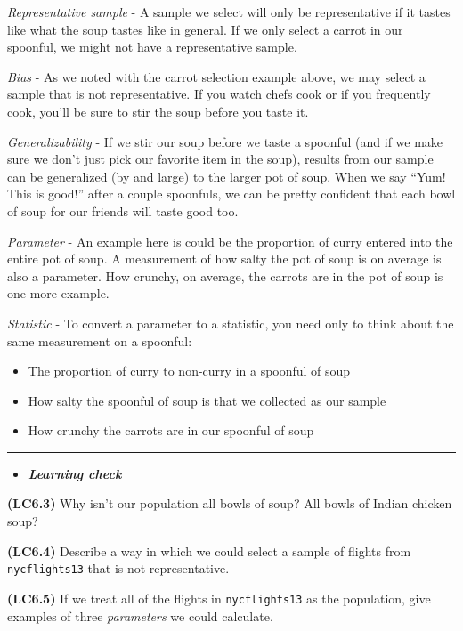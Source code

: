 \documentclass[]{tufte-book}
\let\oldrule=\rule
\renewcommand{\rule}[1]{\oldrule{\linewidth}}
\providecommand{\tightlist}{%
  \setlength{\itemsep}{0pt}\setlength{\parskip}{0pt}}
\newenvironment{rmdblock}[1]
  {\begin{shaded*}
  \begin{itemize}
  \renewcommand{\labelitemi}{
    \raisebox{-.7\height}[0pt][0pt]{
    }
  }
  \item
  }
  {
  \end{itemize}
  \end{shaded*}
  }
\newenvironment{learncheck}
  {\begin{rmdblock}{warning}}
  {\end{rmdblock}}
\begin{document}
\emph{Representative sample} - A sample we select will only be
representative if it tastes like what the soup tastes like in general.
If we only select a carrot in our spoonful, we might not have a
representative sample.

\emph{Bias} - As we noted with the carrot selection example above, we
may select a sample that is not representative. If you watch chefs cook
or if you frequently cook, you'll be sure to stir the soup before you
taste it.

\emph{Generalizability} - If we stir our soup before we taste a spoonful
(and if we make sure we don't just pick our favorite item in the soup),
results from our sample can be generalized (by and large) to the larger
pot of soup. When we say ``Yum! This is good!'' after a couple
spoonfuls, we can be pretty confident that each bowl of soup for our
friends will taste good too.

\emph{Parameter} - An example here is could be the proportion of curry
entered into the entire pot of soup. A measurement of how salty the pot
of soup is on average is also a parameter. How crunchy, on average, the
carrots are in the pot of soup is one more example.

\emph{Statistic} - To convert a parameter to a statistic, you need only
to think about the same measurement on a spoonful:

\begin{itemize}
\tightlist
\item
  The proportion of curry to non-curry in a spoonful of soup
\item
  How salty the spoonful of soup is that we collected as our sample
\item
  How crunchy the carrots are in our spoonful of soup
\end{itemize}

\begin{center}\rule{0.5\linewidth}{\linethickness}\end{center}

\begin{learncheck}
\textbf{\emph{Learning check}}
\end{learncheck}

\textbf{(LC6.3)} Why isn't our population all bowls of soup? All bowls
of Indian chicken soup?

\textbf{(LC6.4)} Describe a way in which we could select a sample of
flights from \texttt{nycflights13} that is not representative.

\textbf{(LC6.5)} If we treat all of the flights in \texttt{nycflights13}
as the population, give examples of three \emph{parameters} we could
calculate.
\end{document}
